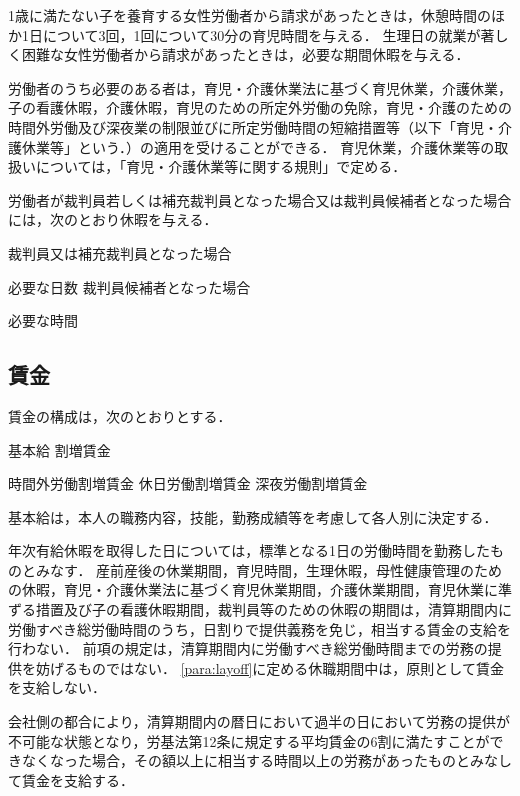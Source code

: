 \documentclass[11pt,a4paper]{jsarticle}
\begin{document}
1歳に満たない子を養育する女性労働者から請求があったときは，休憩時間のほか1日について3回，1回について30分の育児時間を与える．
\term
生理日の就業が著しく困難な女性労働者から請求があったときは，必要な期間休暇を与える．

労働者のうち必要のある者は，育児・介護休業法に基づく育児休業，介護休業，子の看護休暇，介護休暇，育児のための所定外労働の免除，育児・介護のための時間外労働及び深夜業の制限並びに所定労働時間の短縮措置等（以下「育児・介護休業等」という．）の適用を受けることができる．
\term
育児休業，介護休業等の取扱いについては，「育児・介護休業等に関する規則」で定める．

労働者が裁判員若しくは補充裁判員となった場合又は裁判員候補者となった場合には，次のとおり休暇を与える．
\begin{enumerate}
	\itm 裁判員又は補充裁判員となった場合 \par 必要な日数
	\itm 裁判員候補者となった場合\par 必要な時間
\end{enumerate}


\subsection{賃金}

賃金の構成は，次のとおりとする．
\begin{enumerate}
	\itm 基本給
	\itm 割増賃金
	\begin{enumerate}
		\itm 時間外労働割増賃金
		\itm 休日労働割増賃金
		\itm 深夜労働割増賃金
	\end{enumerate}
\end{enumerate}

基本給は，本人の職務内容，技能，勤務成績等を考慮して各人別に決定する．

年次有給休暇を取得した日については，標準となる1日の労働時間を勤務したものとみなす．
\term
産前産後の休業期間，育児時間，生理休暇，母性健康管理のための休暇，育児・介護休業法に基づく育児休業期間，介護休業期間，育児休業に準ずる措置及び子の看護休暇期間，裁判員等のための休暇の期間は，清算期間内に労働すべき総労働時間のうち，日割りで提供義務を免じ，相当する賃金の支給を行わない． 
\term
前項の規定は，清算期間内に労働すべき総労働時間までの労務の提供を妨げるものではない．
\term
\ref{para:layoff}に定める休職期間中は，原則として賃金を支給しない．

会社側の都合により，清算期間内の暦日において過半の日において労務の提供が不可能な状態となり，労基法第12条に規定する平均賃金の6割に満たすことができなくなった場合，その額以上に相当する時間以上の労務があったものとみなして賃金を支給する． 
\end{document}
